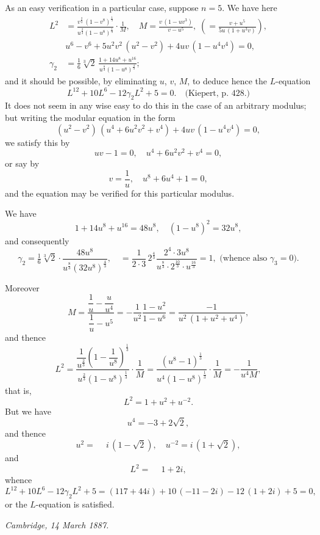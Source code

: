 \documentclass[12pt,a4paper]{article}
\theoremstyle{definition}
\begin{document}
As an easy verification in a particular case, suppose $n = 5$. We have here
\begin{align*}
L^2 &= \frac{v^{\frac{2}{3}}\, (1 - v^8)^{\frac{1}{3}}}{u^{\frac{2}{3}} (1 - u^8)^{\frac{1}{3}}} \cdot \frac{1}{M}, \quad
M = \frac{v\, (1 - uv^3)}{v - u^5}, \;
\left(= \frac{v + u^5}{5u\, (1 + u^3v)} \right),\\
&u^6 - v^6 + 5u^2v^2\, (u^2 - v^2) + 4uv\, (1 - u^4v^4) = 0,\\
\gamma_2 &= \tfrac{1}{6} \sqrt[3]{2}\,
\frac{1 + 14u^8 + u^{16}}{u^{\frac{8}{3}} (1 - u^8)^{\frac{4}{3}}};
\end{align*}
and it should be possible, by eliminating $u$, $v$, $M$, to deduce hence the $L$-equation
\[
L^{12} + 10L^6 - 12\gamma_2 L^2 + 5 = 0. \quad \text{(Kiepert, p.~428.)}
\]
It does not seem in any wise easy to do this in the case of an arbitrary modulus;
but writing the modular equation in the form
\[
(u^2 - v^2)\, (u^4 + 6u^2v^2 + v^4) + 4uv\, (1 - u^4v^4) = 0,
\]
we satisfy this by
\[
uv - 1 = 0, \quad u^4 + 6u^2v^2 + v^4 = 0,
\]
or say by
\[
v = \frac{1}{u}, \quad u^8 + 6u^4 + 1 = 0,
\]
and the equation may be verified for this particular modulus.

We have
\[
1 + 14u^8 + u^{16} = 48u^8, \quad (1 - u^8)^2 = 32u^8,
\]
and consequently
\[
\gamma_2 = \tfrac{1}{6} \sqrt[3]{2} \cdot \frac{48u^8}{u^{\frac{8}{3}} (32u^8)^{\frac{4}{3}}},
\quad = \frac{1}{2 \cdot 3}\, 2^{\frac{4}{3}}
\frac{2^4 \cdot 3u^8}{u^{\frac{8}{3}} \cdot 2^{\frac{10}{3}} \cdot u^{\frac{16}{3}}}
= 1, \text{ (whence also } \gamma_3 = 0\text{).}
\]

Moreover
\[
M = \frac{\dfrac{1}{u} - \dfrac{u}{u^4}}{\dfrac{1}{u} - u^5}
= -\frac{1}{u^2} \frac{1 - u^2}{1 - u^6}
= \frac{-1}{u^2\, (1 + u^2 + u^4)},
\]
and thence
\[
L^2 = \frac{\dfrac{1}{u^{\frac{2}{3}}} \left(1 - \dfrac{1}{u^8}\right)^{\frac{1}{3}}}{u^{\frac{2}{3}} (1 - u^8)^{\frac{1}{3}}} \cdot \frac{1}{M}
= \frac{(u^8 - 1)^{\frac{1}{3}}}{u^4 (1 - u^8)^{\frac{1}{3}}} \cdot \frac{1}{M}
= -\frac{1}{u^4 M},
\]
that is,
\[
L^2 = 1 + u^2 + u^{-2}.
\]
But we have
\[
u^4 = -3 + 2\sqrt{2},
\]
and thence
\[
u^2 = \phantom{-} i\,(1 - \sqrt{2}), \quad u^{-2} = i\,(1 + \sqrt{2}),
\]
and
\[
L^2 = \phantom{-} 1 + 2i,
\]
whence
\[
L^{12} + 10L^6 - 12\gamma_2 L^2 + 5
= (117 + 44i) + 10\, (-11 - 2i) - 12\, (1 + 2i) + 5 = 0,
\]
or the $L$-equation is satisfied.

\begin{flushright}
\textit{Cambridge, 14 March 1887.}
\end{flushright}
\end{document}
